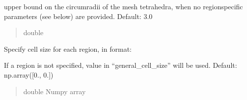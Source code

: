 \documentclass[letterpaper,10pt,english]{sphinxmanual}
\begin{document}
\begin{fulllineitems}
\begin{fulllineitems}
\begin{quote}
\begin{description}
\end{description}\end{quote}

\end{fulllineitems}


\begin{fulllineitems}
\label{\detokenize{_autosummary/nirfasterff.utils.MeshingParams:nirfasterff.utils.MeshingParams.general_cell_size}}
\pysigstartsignatures
{}
\pysigstopsignatures
\sphinxAtStartPar
upper bound on the circumradii of the mesh tetrahedra, when no region\sphinxhyphen{}specific parameters (see below) are provided. Default: 3.0
\begin{quote}\begin{description}
\sphinxAtStartPar
double

\end{description}\end{quote}

\end{fulllineitems}


\begin{fulllineitems}
\label{\detokenize{_autosummary/nirfasterff.utils.MeshingParams:nirfasterff.utils.MeshingParams.subdomain}}
\pysigstartsignatures
{}
\pysigstopsignatures
\sphinxAtStartPar
Specify cell size for each region, in format:

\begin{sphinxVerbatim}[commandchars=\\\{\}]
\PYG{p}{[} \PYG{p}{]}
\PYG{p}{[} \PYG{p}{]}
\end{sphinxVerbatim}

\sphinxAtStartPar
If a region is not specified, value in “general\_cell\_size” will be used.  Default: np.array({[}0., 0.{]})
\begin{quote}\begin{description}
\sphinxAtStartPar
double Numpy array


\end{description}
\end{quote}
\end{fulllineitems}
\end{fulllineitems}
\end{document}
